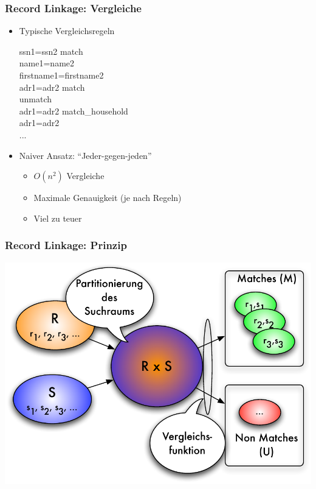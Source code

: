     \begin{frame}
    \frametitle{Record Linkage: Vergleiche}
    
    \begin{itemize}
    \item Typische Vergleichsregeln
    
    \hspace*{-1cm}\begin{sql}
     ssn1=ssn2  match \\
      name1=name2  \\
    \1   firstname1=firstname2  \\
    \2     adr1=adr2  match \\
    \2     unmatch \\
    \1    adr1=adr2  match\_household \\
      adr1=adr2  \\
     ...
    \end{sql}
    
    \item Naiver Ansatz: "`Jeder-gegen-jeden"'
    \begin{itemize}
    \item $O(n^2)$ Vergleiche
    \item Maximale Genauigkeit (je nach Regeln)
    \item Viel zu teuer
    \end{itemize}
    \end{itemize}
    
    \end{frame}
    
    
    \begin{frame}
    \frametitle{Record Linkage: Prinzip}
    
    \begin{center}
    \includegraphics[scale=.6]{fig4/record-linkage.pdf}
    \end{center}
    
    \end{frame}
    
